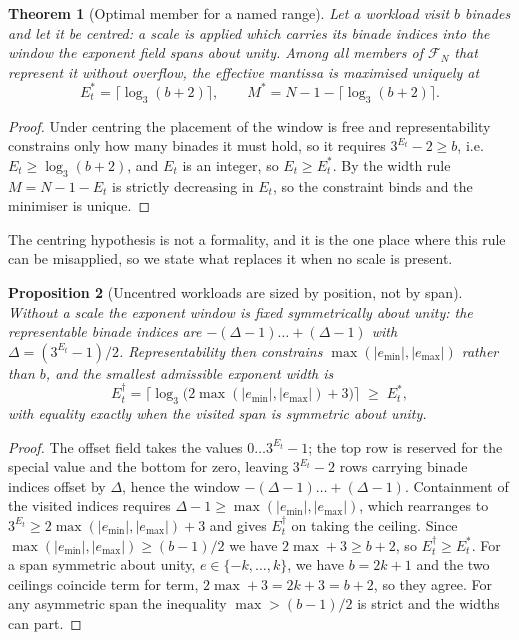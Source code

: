 \documentclass[11pt]{article}
\newtheorem{theorem}{Theorem}
\newtheorem{proposition}[theorem]{Proposition}
\theoremstyle{definition}
\begin{document}
\begin{theorem}[Optimal member for a named range]
\label{thm:optimal}
Let a workload visit $b$ binades and let it be \emph{centred}: a scale is applied
which carries its binade indices into the window the exponent field spans about
unity. Among all members of $\mathcal{F}_N$ that
represent it without overflow, the effective mantissa is maximised uniquely at
\[
  E_t^{*} = \bigl\lceil \log_3 (b+2) \bigr\rceil,
  \qquad
  M^{*} = N - 1 - \bigl\lceil \log_3 (b+2) \bigr\rceil .
\]
\end{theorem}
\begin{proof}
Under centring the placement of the window is free and representability
constrains only how many binades it must hold, so it requires $3^{E_t}-2 \ge b$,
i.e.\ $E_t \ge \log_3(b+2)$, and
$E_t$ is an integer, so $E_t \ge E_t^{*}$. By the width rule $M = N-1-E_t$ is
strictly decreasing in $E_t$, so the constraint binds and the minimiser is unique.
\end{proof}

The centring hypothesis is not a formality, and it is the one place where this
rule can be misapplied, so we state what replaces it when no scale is present.

\begin{proposition}[Uncentred workloads are sized by position, not by span]
\label{prop:uncentred}
Without a scale the exponent window is fixed symmetrically about unity: the
representable binade indices are $-(\Delta-1) \dots +(\Delta-1)$ with
$\Delta = (3^{E_t}-1)/2$. Representability then constrains
$\max(|e_{\min}|,|e_{\max}|)$ rather than $b$, and the smallest admissible
exponent width is
\[
  E_t^{\dagger} = \bigl\lceil \log_3\bigl(2\max(|e_{\min}|,|e_{\max}|)+3\bigr) \bigr\rceil
  \;\ge\; E_t^{*},
\]
with equality exactly when the visited span is symmetric about unity.
\end{proposition}
\begin{proof}
The offset field takes the values $0 \dots 3^{E_t}-1$; the top row is reserved for
the special value and the bottom for zero, leaving $3^{E_t}-2$ rows carrying
binade indices offset by $\Delta$, hence the window $-(\Delta-1) \dots +(\Delta-1)$.
Containment of the visited indices requires $\Delta-1 \ge \max(|e_{\min}|,|e_{\max}|)$,
which rearranges to $3^{E_t} \ge 2\max(|e_{\min}|,|e_{\max}|)+3$ and gives
$E_t^{\dagger}$ on taking the ceiling. Since
$\max(|e_{\min}|,|e_{\max}|) \ge (b-1)/2$ we have $2\max+3 \ge b+2$, so
$E_t^{\dagger} \ge E_t^{*}$. For a span symmetric about unity,
$e \in \{-k,\dots,k\}$, we have $b=2k+1$ and the two ceilings coincide term
for term, $2\max+3 = 2k+3 = b+2$, so they agree. For any
asymmetric span the inequality $\max > (b-1)/2$ is strict and the widths can part.
\end{proof}
\end{document}
